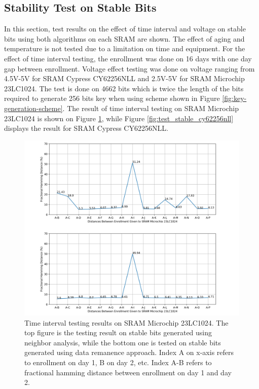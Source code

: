 \subsection{Stability Test on Stable Bits}\label{ch:hd_intra_stable}
In this section, test results on the effect of time interval and voltage on stable bits using both algorithms on each SRAM are shown. The effect of aging and temperature is not tested due to a limitation on time and equipment. For the effect of time interval testing, the enrollment was done on 16 days with one day gap between enrollment. Voltage effect testing was done on voltage ranging from 4.5V-5V for SRAM Cypress CY62256NLL and 2.5V-5V for SRAM Microchip 23LC1024. The test is done on 4662 bits which is twice the length of the bits required to generate 256 bits key when using scheme shown in Figure \ref{fig:key-generation-scheme}. The result of time interval testing on SRAM Microchip 23LC1024 is shown on Figure \ref{fig:test_stable_23lc1024}, while Figure \ref{fig:test_stable_cy62256nll} displays the result for SRAM Cypress CY62256NLL.

\begin{figure}[tph!]
    \centerline{\includegraphics[width={1.1\textwidth}]{images/23lc1024_hd_intra_time_stable}}
    \caption{Time interval testing results on SRAM Microchip 23LC1024. The top figure is the testing result on stable bits generated using neighbor analysis, while the bottom one is tested on stable bits generated using data remanence approach. Index A on x-axis refers to enrollment on day 1, B on day 2, etc. Index A-B refers to fractional hamming distance between enrollment on day 1 and day 2.}
    \label{fig:test_stable_23lc1024}
\end{figure}

